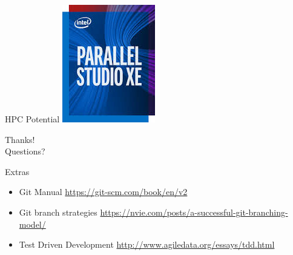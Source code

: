 \documentclass[sans,mathserif,aspectratio=169]{beamer}
\begin{document}
\begin{frame}{HPC Potential}
\centering
\includegraphics[width=0.30\linewidth]{intel.jpeg}
\end{frame}

\begin{frame}
\centering
\Huge
Thanks! \\
Questions?
\end{frame}

\begin{frame}{Extras}
  \begin{itemize}
    \item Git Manual \url{https://git-scm.com/book/en/v2}
    \item Git branch strategies \url{https://nvie.com/posts/a-successful-git-branching-model/}
    \item Test Driven Development \url{http://www.agiledata.org/essays/tdd.html}
  \end{itemize}
\end{frame}
\end{document}
